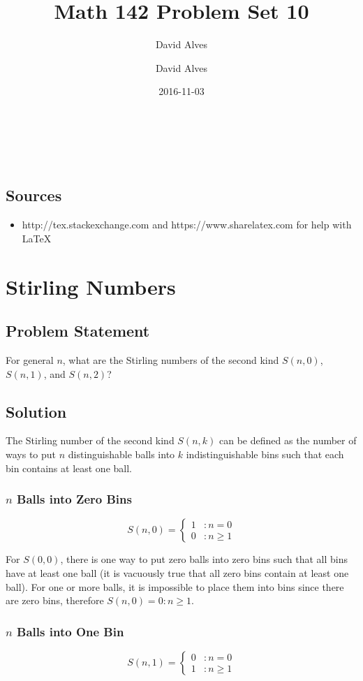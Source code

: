 \documentclass[12pt]{article}
\author{David Alves}
\title{Math 142 Problem Set 10}
\author{David Alves}
\date{2016-11-03}
\newcommand{\ProblemStatement}[1]{
\subsection*{Problem Statement}
#1
\subsection*{Solution}
}
\begin{document}

\begin{center}
\large \thetitle \\
\theauthor \\
\thedate
\end{center}

\subsection*{Sources}

    \begin{itemize}
    \item http://tex.stackexchange.com and https://www.sharelatex.com for help with \LaTeX
    \end{itemize}

\section{Stirling Numbers}
\ProblemStatement{
For general $n$, what are the Stirling numbers of the second kind $S(n,0)$, $S(n,1)$, and $S(n,2)$?
}

The Stirling number of the second kind $S(n,k)$ can be defined as the number of ways to put $n$ distinguishable balls into $k$ indistinguishable bins such that each bin contains at least one ball. 

\subsubsection{$n$ Balls into Zero Bins}
\[
    S(n, 0) = 
    \begin{cases}
        1&: n=0\\
        0&: n \ge 1
    \end{cases}
\]

For $S(0,0)$, there is one way to put zero balls into zero bins such that all bins have at least one ball (it is vacuously true that all zero bins contain at least one ball). For one or more balls, it is impossible to place them into bins since there are zero bins, therefore $S(n, 0) = 0: n \ge 1$.

\subsubsection{$n$ Balls into One Bin}
\[
    S(n, 1) = 
    \begin{cases}
        0&: n=0\\
        1&: n \ge 1
    \end{cases}
\]
\end{document}
